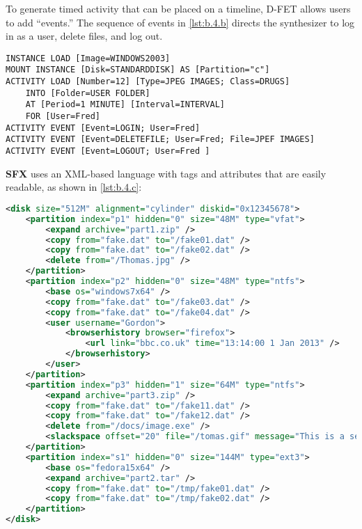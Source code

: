 To generate timed activity that can be placed on a timeline, D-FET
allows users to add ``events.'' The sequence of events in
\autoref{lst:b.4.b} directs the synthesizer to log in as a user, delete
files, and log out.

\begin{lstlisting}[label={lst:b.4.b}, caption={Extension of the D-FET declarative scenario with events \cite{williamCloudbasedDigitalForensics2011}}, ]
INSTANCE LOAD [Image=WINDOWS2003] 
MOUNT INSTANCE [Disk=STANDARDDISK] AS [Partition="c"] 
ACTIVITY LOAD [Number=12] [Type=JPEG IMAGES; Class=DRUGS] 
    INTO [Folder=USER FOLDER] 
    AT [Period=1 MINUTE] [Interval=INTERVAL] 
    FOR [User=Fred]
ACTIVITY EVENT [Event=LOGIN; User=Fred] 
ACTIVITY EVENT [Event=DELETEFILE; User=Fred; File=JPEF IMAGES] 
ACTIVITY EVENT [Event=LOGOUT; User=Fred ]
\end{lstlisting}

\textbf{SFX} \cite{russellForensicImageDescription2012} uses an
XML-based language with tags and attributes that are easily readable, as
shown in \autoref{lst:b.4.c}:

\begin{lstlisting}[label={lst:b.4.c}, caption={Sample SFX declarative scenario expressed as XML \cite{russellForensicImageDescription2012}}, language=XML]
<disk size="512M" alignment="cylinder" diskid="0x12345678">
    <partition index="p1" hidden="0" size="48M" type="vfat">
        <expand archive="part1.zip" />
        <copy from="fake.dat" to="/fake01.dat" />
        <copy from="fake.dat" to="/fake02.dat" />
        <delete from="/Thomas.jpg" />
    </partition>
    <partition index="p2" hidden="0" size="48M" type="ntfs">
        <base os="windows7x64" />
        <copy from="fake.dat" to="/fake03.dat" />
        <copy from="fake.dat" to="/fake04.dat" />
        <user username="Gordon">
            <browserhistory browser="firefox">
                <url link="bbc.co.uk" time="13:14:00 1 Jan 2013" />
            </browserhistory>
        </user>
    </partition>
    <partition index="p3" hidden="1" size="64M" type="ntfs">
        <expand archive="part3.zip" />
        <copy from="fake.dat" to="/fake11.dat" />
        <copy from="fake.dat" to="/fake12.dat" />
        <delete from="/docs/image.exe" />
        <slackspace offset="20" file="/tomas.gif" message="This is a secret message" />
    </partition>
    <partition index="s1" hidden="0" size="144M" type="ext3">
        <base os="fedora15x64" />
        <expand archive="part2.tar" />
        <copy from="fake.dat" to="/tmp/fake01.dat" />
        <copy from="fake.dat" to="/tmp/fake02.dat" />
    </partition>
</disk>
\end{lstlisting}

